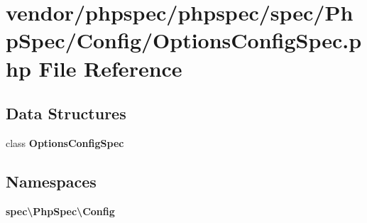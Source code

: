\section{vendor/phpspec/phpspec/spec/\+Php\+Spec/\+Config/\+Options\+Config\+Spec.php File Reference}
\label{_options_config_spec_8php}
\subsection*{Data Structures}
\begin{DoxyCompactItemize}
\item 
class {\bf Options\+Config\+Spec}
\end{DoxyCompactItemize}
\subsection*{Namespaces}
\begin{DoxyCompactItemize}
\item 
 {\bf spec\textbackslash{}\+Php\+Spec\textbackslash{}\+Config}
\end{DoxyCompactItemize}
